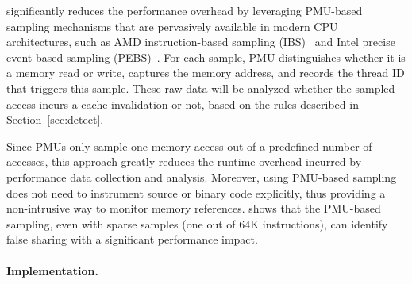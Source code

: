 \cheetah{} significantly reduces the performance overhead by leveraging PMU-based sampling mechanisms that are pervasively available in modern CPU architectures, such as AMD instruction-based sampling (IBS)~\cite{AMDIBS:07} and Intel precise event-based sampling (PEBS)~\cite{IntelArch:PEBS:Sept09}. For each sample, PMU distinguishes whether it is a memory read or write, captures the memory address, and records the thread ID that triggers this sample. These raw data will be analyzed whether the sampled access incurs a cache invalidation or not, based on the rules described in Section~\ref{sec:detect}.

Since PMUs only sample one memory access out of a predefined number of accesses, this approach greatly reduces the runtime overhead incurred by performance data collection and analysis. Moreover, using PMU-based sampling does not need to instrument source or binary code explicitly, thus providing a non-intrusive way to monitor memory references. \cheetah{} shows that the PMU-based sampling, even with sparse samples (one out of 64K instructions), can identify false sharing with a significant performance impact.
 

\paragraph{Implementation.} 

